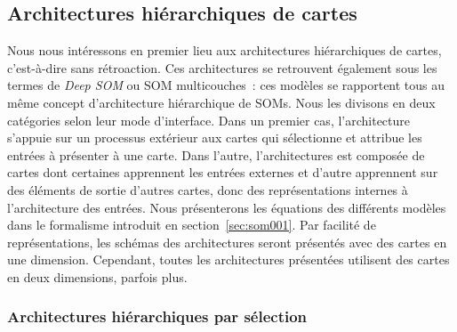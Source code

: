 \documentclass[../main]{subfiles}
\begin{document}
\subsection{Architectures hiérarchiques de cartes}

Nous nous intéressons en premier lieu aux architectures hiérarchiques de cartes, c'est-à-dire sans rétroaction. Ces architectures se retrouvent également sous les termes de \emph{Deep SOM} ou SOM multicouches~: ces modèles se rapportent tous au même concept d'architecture hiérarchique de SOMs.
Nous les divisons en deux catégories selon leur mode d'interface. Dans un premier cas, l'architecture s'appuie sur un processus extérieur aux cartes qui sélectionne et attribue les entrées à présenter à une carte. Dans l'autre, l'architectures est composée de cartes dont certaines apprennent les entrées externes et d'autre apprennent sur des éléments de sortie d'autres cartes, donc des représentations internes à l'architecture des entrées.
Nous présenterons les équations des différents modèles dans le formalisme introduit en section~\ref{sec:som001}. 
Par facilité de représentations, les schémas des architectures seront présentés avec des cartes en une dimension. Cependant, toutes les architectures présentées utilisent des cartes en deux dimensions, parfois plus.
\subsubsection{Architectures hiérarchiques par sélection}
\end{document}
